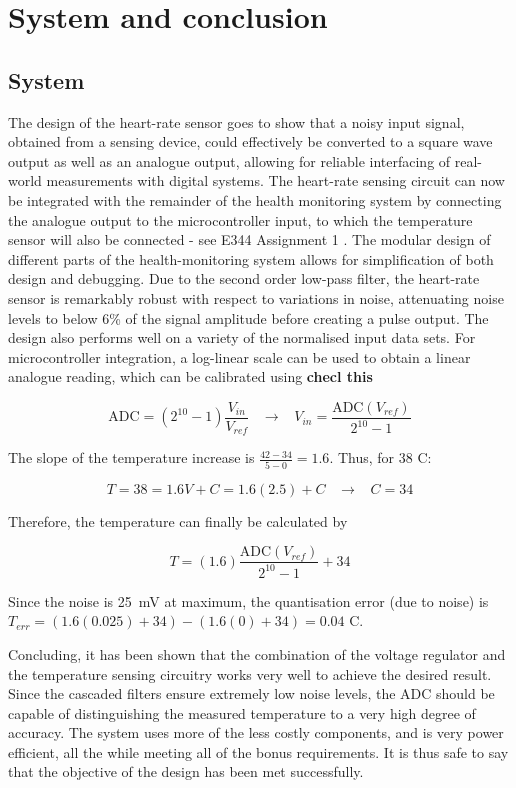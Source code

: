 \chapter{System and conclusion}
\vspace{-5mm}
\section{System}

The design of the heart-rate sensor goes to show that a noisy input signal, obtained from a sensing device, could effectively be converted to a square wave output as well as an analogue output, allowing for reliable interfacing of real-world measurements with digital systems. The heart-rate sensing circuit can now be integrated with the remainder of the health monitoring system by connecting the analogue output to the microcontroller input, to which the temperature sensor will also be connected - see E344 Assignment 1 \cite{prev}. The modular design of different parts of the health-monitoring system allows for simplification of both design and debugging.
Due to the second order low-pass filter, the heart-rate sensor is remarkably robust with respect to variations in noise, attenuating noise levels to below 6\% of the signal amplitude before creating a pulse output. The design also performs well on a variety of the normalised input data sets. For microcontroller integration, a log-linear scale can be used to obtain a linear analogue reading, which can be calibrated using  \textbf{checl this}

$$\mathrm{ADC} = (2^{10}-1)\frac{V_{in}}{V_{ref}} \;\;\; \rightarrow \;\;\; V_{in} = \frac{\mathrm{ADC}(V_{ref})}{2^{10}-1}$$

The slope of the temperature increase is $\frac{42-34}{5-0} = 1.6$. Thus, for 38 C:

$$T = 38 = 1.6V + C = 1.6(2.5) + C \;\;\; \rightarrow \;\;\; C = 34$$

Therefore, the temperature can finally be calculated by

$$T = (1.6)\frac{\mathrm{ADC}(V_{ref})}{2^{10}-1} + 34$$

Since the noise is \SI{25}{\milli\volt} at maximum, the quantisation error (due to noise) is $T_{err} = (1.6(0.025) + 34) - (1.6(0) + 34) = 0.04$ C. 

Concluding, it has been shown that the combination of the voltage regulator and the temperature sensing circuitry works very well to achieve the desired result. Since the cascaded filters ensure extremely low noise levels, the ADC should be capable of distinguishing the measured temperature to a very high degree of accuracy. The system uses more of the less costly components, and is very power efficient, all the while meeting all of the bonus requirements. It is thus safe to say that the objective of the design has been met successfully.

